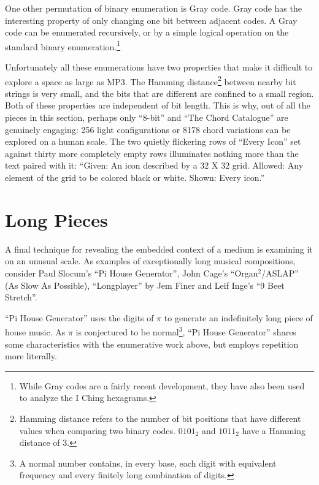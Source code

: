 \documentclass{thesis}
\begin{document}
One other permutation of binary enumeration is Gray code. Gray code has the interesting property of only changing one bit between adjacent codes. A Gray code can be enumerated recursively, or by a simple logical operation on the standard binary enumeration.\footnote{While Gray codes are a fairly recent development, they have also been used to analyze the I Ching hexagrams.\cite{Mair79}}

Unfortunately all these enumerations have two properties that make it difficult to explore a space as large as MP3. The Hamming distance\footnote{Hamming distance refers to the number of bit positions that have different values when comparing two binary codes. $0101_2$ and $1011_2$ have a Hamming distance of 3.} between nearby bit strings is very small, and the bits that are different are confined to a small region. Both of these properties are independent of bit length. This is why, out of all the pieces in this section, perhaps only ``8-bit'' and ``The Chord Catalogue'' are genuinely engaging: 256 light configurations or 8178 chord variations can be explored on a human scale. The two quietly flickering rows of ``Every Icon'' set against thirty more completely empty rows illuminates nothing more than the text paired with it: ``Given: An icon described by a 32 X 32 grid. Allowed: Any element of the grid to be colored black or white. Shown: Every icon.''
		
\section{Long Pieces}

A final technique for revealing the embedded context of a medium is examining it on an unusual scale. As examples of exceptionally long musical compositions, consider Paul Slocum's ``Pi House Generator''\cite{paul_slocum_pi_2007}, John Cage's ``Organ$^2$/ASLAP'' (As Slow As Possible)\cite{john_cage_as_????}, ``Longplayer'' by Jem Finer\cite{jem_finer_longplayer_????} and Leif Inge's ``9 Beet Stretch''\cite{leif_inge_9_2007}.

``Pi House Generator'' uses the digits of $\pi$ to generate an indefinitely long piece of house music. As $\pi$ is conjectured to be normal\footnote{A normal number contains, in every base, each digit with equivalent frequency and every finitely long combination of digits.\cite{weisstein_normal_????}}, ``Pi House Generator'' shares some characteristics with the enumerative work above, but employs repetition more literally.
\end{document}
